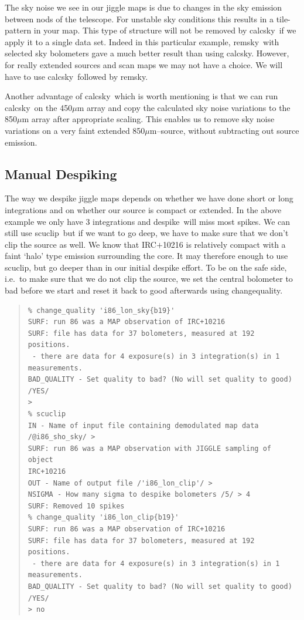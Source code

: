 \documentclass[twoside,11pt]{article}
\newenvironment{myquote}{\begin{quote}\begin{small}}{\end{small}\end{quote}}
\newcommand{\task}[1]{\textsf{#1}}
\newcommand{\calcsky}{\xref{\task{calcsky}}{sun216}{CALCSKY}}
\newcommand{\chgqual}{\xref{\task{change\_\-qua\-lity}}{sun216}{CHANGE_QUALITY}}
\newcommand{\desp}{\xref{\task{despike}}{sun216}{DESPIKE}}
\newcommand{\remsky}{\xref{\task{remsky}}{sun216}{REMSKY}}
\newcommand{\scuclip}{\xref{\task{scuclip}}{sun216}{SCUCLIP}}
\newcommand{\xref}[3]{#1}
\newcommand{\xlabel}[1]{}
\renewcommand{\_}{\texttt{\symbol{95}}}
\begin{document}
The sky noise we see in our jiggle maps is due to changes in the sky
emission between nods of the telescope.  For unstable sky conditions
this results in a tile-pattern in your map.  This type of structure
will not be removed by \calcsky\ if we apply it to a single data set.
Indeed in this particular example, \remsky\ with selected sky
bolometers gave a much better result than using \calcsky.  However,
for really extended sources and scan maps we may not have a choice.
We will have to use \calcsky\ followed by \remsky.

Another advantage of \calcsky\ which is worth mentioning is that we
can run \calcsky\ on the 450$\mu$m array and copy the calculated sky
noise variations to the 850$\mu$m array after appropriate scaling.
This enables us to remove sky noise variations on a very faint
extended 850$\mu$m--source, without subtracting out source emission.

\subsection{\xlabel{Despiking} Manual Despiking}

The way we despike jiggle maps depends on whether we have done short
or long integrations and on whether our source is compact or extended.
In the above example we only have 3 integrations and \desp\ will miss
most spikes.  We can still use \scuclip\, but if we want to go deep,
we have to make sure that we don't clip the source as well.  We know
that IRC$+$10216 is relatively compact with a faint `halo' type
emission surrounding the core.  It may therefore enough to use
\scuclip, but go deeper than in our initial despike effort.  To be on
the safe side, i.e.\ to make sure that we do not clip the source, we
set the central bolometer to bad before we start and reset it back to
good afterwards using \chgqual.


\begin{myquote}
\begin{verbatim}
% change_quality 'i86_lon_sky{b19}'
SURF: run 86 was a MAP observation of IRC+10216
SURF: file has data for 37 bolometers, measured at 192 positions.
 - there are data for 4 exposure(s) in 3 integration(s) in 1
measurements.
BAD_QUALITY - Set quality to bad? (No will set quality to good) /YES/
>
% scuclip
IN - Name of input file containing demodulated map data
/@i86_sho_sky/ >
SURF: run 86 was a MAP observation with JIGGLE sampling of object
IRC+10216
OUT - Name of output file /'i86_lon_clip'/ >
NSIGMA - How many sigma to despike bolometers /5/ > 4
SURF: Removed 10 spikes
% change_quality 'i86_lon_clip{b19}'
SURF: run 86 was a MAP observation of IRC+10216
SURF: file has data for 37 bolometers, measured at 192 positions.
 - there are data for 4 exposure(s) in 3 integration(s) in 1
measurements.
BAD_QUALITY - Set quality to bad? (No will set quality to good) /YES/
> no
\end{verbatim}
\end{myquote}
\end{document}
